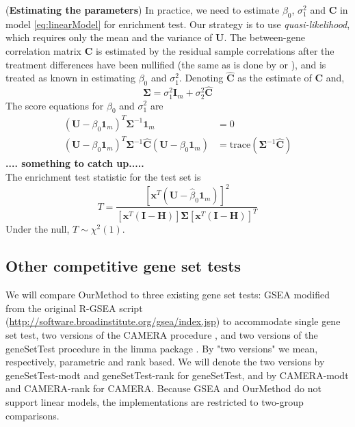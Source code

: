 \documentclass[11pt, a4paper]{article}
\begin{document}
	(\textbf{Estimating the parameters}) In practice, we need to estimate $\beta_0$, $\sigma_1^2$ and $\bm C$ in model \ref{eq:linearModel} for enrichment test.
	Our strategy is to use \textit{quasi-likelihood}, which requires only the mean and the variance of $\bm U$.  The between-gene correlation matrix $\bm C$ is estimated by the residual sample correlations after the treatment differences have been nullified (the same as is done by \cite{efron2007correlation} or \cite{wu2012camera}), and is treated as known in estimating $\beta_0$ and $\sigma_1^2$. 
	Denoting $\hat{\bm C}$ as the estimate of $\bm C$ and,
	\begin{equation}\label{eq:estimateparameter}
		\bm\Sigma = \sigma^2_1\bm I_m + \sigma_2^2 \hat{\bm C}
	\end{equation}
	The score equations for $\beta_0$ and $\sigma_1^2$ are
	\begin{equation}
		\begin{aligned}
			(\bm U - \beta_0\bm 1_m)^T \bm \Sigma^{-1}\bm 1_m & = 0\\
			(\bm U - \beta_0\bm 1_m)^T \bm \Sigma^{-1} \hat{\bm C} (\bm U - \beta_0\bm 1_m) &= \text{trace}(\bm \Sigma^{-1}\hat{\bm C})
		\end{aligned}
	\end{equation}
	\textbf{.... something to catch up.....}\\
	The enrichment test statistic for the test set is 
	\begin{equation}\label{eq:teststatistic}
		T = \frac{\left[\bm x^T(\bm U - \hat{\beta}_0 \bm 1_m )\right]^2}{\left[\bm x^T(\bm I - \bm H)\right]\bm \Sigma \left[\bm x^T(\bm I - \bm H)\right]^T}
	\end{equation} 
	Under the null, $T\sim \chi^2(1)$.
	
	
	\subsection{Other competitive gene set tests}
	We will compare OurMethod to three existing gene set tests: GSEA \citep{subramanian2005gene} modified from the original R-GSEA script (\url{http://software.broadinstitute.org/gsea/index.jsp}) to accommodate single gene set test, two versions of the CAMERA procedure \citep{wu2012camera}, and two versions of the geneSetTest procedure in the limma package \citep{smyth2005limma}. By "two versions" we mean, respectively, parametric and rank based. We will denote the two versions by geneSetTest-modt and geneSetTest-rank for geneSetTest, and by CAMERA-modt and CAMERA-rank for CAMERA. Because GSEA and OurMethod do not support linear models, the implementations are restricted to two-group comparisons.
	
\end{document}
